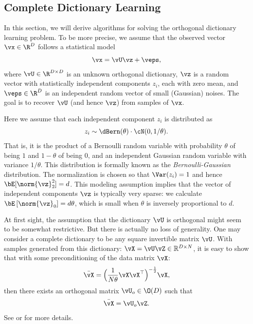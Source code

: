 \documentclass[../../book-main.tex]{subfiles}
\begin{document}
\subsection{Complete Dictionary Learning}
\label{sec:complete-dictionary}

In this section, we will derive algorithms for solving the orthogonal
dictionary learning problem. To be more precise,  we assume that the
observed vector $\vx \in \R^D$ follows a statistical model
\begin{equation}
    \vx = \vU \vz + \veps,
    \label{eq:ica-model-ch2}
\end{equation}
where $\vU \in \R^{D \times D}$ is an unknown orthogonal dictionary,
$\vz$ is a random vector with statistically independent components
$z_i$, each with zero mean, and $\veps \in \R^D$ is an independent
random vector of small (Gaussian) noises. The goal is to recover
$\vU$ (and hence $\vz$) from samples of $\vx$.

Here we assume that each independent component $z_i$ is distributed
as $$z_i \sim \dBern(\theta) \cdot \cN(0, 1/\theta).$$ That
is, it is the product of a Bernoulli random variable with probability
$\theta$ of being $1$ and $1-\theta$ of being $0$, and an independent
Gaussian random variable with variance $1/\theta$. This distribution
is formally known as the {\em Bernoulli-Gaussian} distribution.
The normalization is chosen so that $\Var(z_i) = 1$ and hence
$\bE[\norm{\vz}_2^2]=d$.
This modeling assumption implies that the vector of independent
components $\vz$ is typically very sparse:
we calculate $\bE\left[\norm{\vz}_0\right] = d\theta$, which is small
when $\theta$ is inversely proportional to $d$.

\begin{remark}
    At first sight, the assumption that the dictionary $\vU$ is
    orthogonal might seem to be somewhat restrictive. But there is
    actually no loss of generality. One may consider a complete
    dictionary to be any square invertible matrix $\vU$. With samples
    generated from this dictionary: $\vX = \vU \vZ \in
    \mathbb{R}^{D\times N}$, it is easy to show that with some
    preconditioning of the data matrix $\vX$:
    \begin{equation}
        \bar{\vX} = \Big(\frac{1}{N\theta} \vX\vX^\top\Big)^{-\frac{1}{2}}\vX,
    \end{equation}
    then there exists an orthogonal matrix $\vU_{o} \in \O(D)$ such that
    \begin{equation}
        \bar{\vX} = \vU_{o}\vZ.
    \end{equation}
    See  or \cite{sun2017completeI} for more details.
\end{remark}
\end{document}

